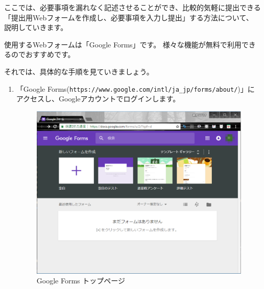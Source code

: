 \documentclass[11pt,a4paper]{jsarticle}
\begin{document}
            ここでは、必要事項を漏れなく記述させることができ、比較的気軽に提出できる「提出用Webフォームを作成し、必要事項を入力し提出」する方法について、
            説明していきます。

            使用するWebフォームは「Google Forms」です。
            様々な機能が無料で利用できるのでおすすめです。

            それでは、具体的な手順を見ていきましょう。
            \begin{enumerate}
                \item 「Google Forms(\texttt{https://www.google.com/intl/ja\_jp/forms/about/})」にアクセスし、Googleアカウントでログインします。
                        \begin{figure}[htbp]
                            \begin{center}
                            \includegraphics[width=12.0cm]{./image/form01.eps}
                            \caption{Google Forms トップページ}
                            \label{fig:form01}
                            \end{center}
                        \end{figure}


\end{enumerate}
\end{document}
